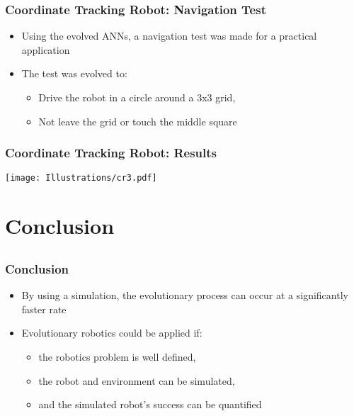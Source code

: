 \documentclass{beamer}
\begin{document}
\begin{frame}
\frametitle{Coordinate Tracking Robot: Navigation Test}
\begin{itemize}
\item Using the evolved ANNs, a navigation test was made for a practical application
\item The test was evolved to:
\begin{itemize}
\item Drive the robot in a circle around a 3x3 grid,
\item Not leave the grid or touch the middle square
\end{itemize}
\end{itemize}
\end{frame}

\begin{frame}
  \frametitle{Coordinate Tracking Robot: Results}
\begin{center}
 \texttt{[image: Illustrations/cr3.pdf]}
       \\
\end{center}
\end{frame}

\section{Conclusion}
\subsection{}
\begin{frame}
  \frametitle{Conclusion}
  \begin{itemize}
\item By using a simulation, the evolutionary process can occur at a significantly faster rate
\item Evolutionary robotics could be applied if:
 \begin{itemize}
\item the robotics problem is well defined, %
\item the robot and environment can be simulated,
\item and the simulated robot's success can be quantified
\end{itemize}
\end{itemize}
\end{frame}
\end{document}
